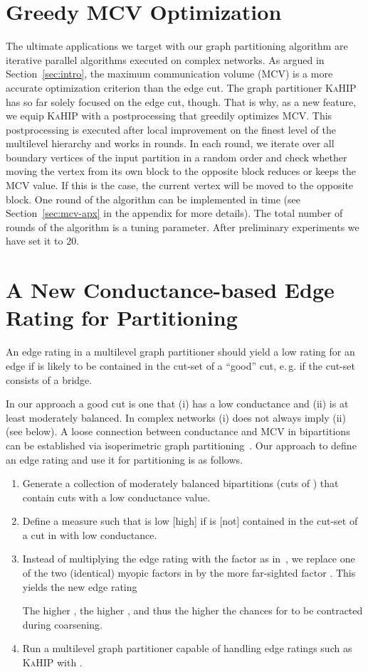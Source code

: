 \documentclass[pdftex]{llncs}
\newcommand{\eg}{e.\,g.\xspace}
\newcommand{\kahip}{\textsc{KaHIP}\xspace}
\numberwithin{equation}{section}
\numberwithin{example}{section}
\numberwithin{table}{section}
\begin{document}
\section{Greedy MCV Optimization}
\label{sec:GP}
The ultimate applications we target with our graph partitioning algorithm are iterative parallel algorithms executed on complex
networks. As argued in Section~\ref{sec:intro}, the maximum communication volume (MCV)
is a more accurate optimization criterion than the edge cut.
The graph partitioner \kahip has so far solely focused on the edge
cut, though. That is why, as a new feature, we equip \kahip with a
postprocessing that greedily optimizes MCV. This postprocessing is
executed after local improvement on the finest level of the multilevel
hierarchy and works in rounds.
In each round, we iterate over all boundary vertices of the input
partition in a random order and check whether moving the vertex from its
own block to the opposite block reduces or keeps the MCV value.
If this is the case, the current vertex will be moved to the
opposite block.  One round of the algorithm can be implemented in
 time (see Section~\ref{sec:mcv-apx} in the appendix
for more details).  The total number of rounds of the algorithm is a tuning parameter.  After
preliminary experiments we have set it to 20.


\section{A New Conductance-based Edge Rating for Partitioning}
\label{sec:BI}
An edge rating in a multilevel graph partitioner should yield a low
rating for an edge  if  is likely to be contained in the cut-set
of a ``good'' cut, \eg if the cut-set consists of a bridge.

In our approach a good cut is one that (i) has a low conductance and
(ii) is at least moderately balanced. In complex networks (i) does not
always imply (ii) (see below).  A loose connection between conductance
and MCV in bipartitions can be established via isoperimetric graph
partitioning~\cite{GradyS06isoperimetric}.  Our approach to define an
edge rating and use it for partitioning is as follows.


\begin{enumerate}
\item Generate a collection  of moderately balanced
  bipartitions (cuts of ) that contain cuts with a low conductance
  value.
\item Define a measure  such that  is low
  [high] if  is [not] contained in the cut-set of a cut in
   with low conductance.
\item Instead of multiplying the edge rating  with the factor  as in~\cite{Safro2012a},
  we replace one of the two (identical) myopic factors  in  by the more far-sighted factor
  . This yields the new edge rating

  

  The higher , the higher , and thus the higher
  the chances for  to be contracted during coarsening.
\item Run a multilevel graph partitioner capable of handling edge ratings
such as \kahip with .
\end{enumerate}
\end{document}
